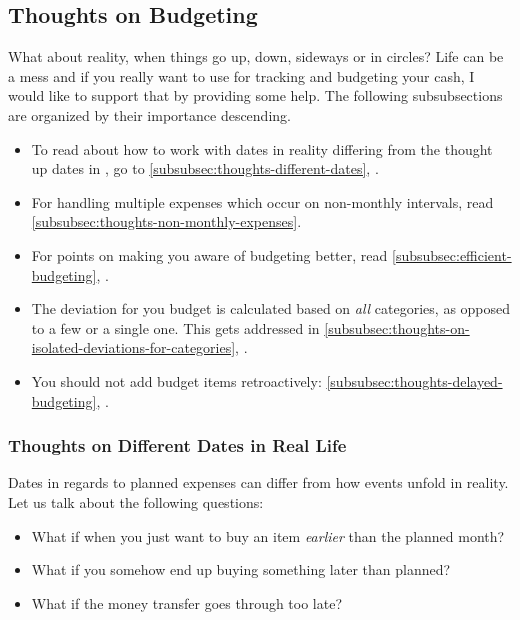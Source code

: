 \subsection{Thoughts on Budgeting}
\label{subsec:thoughts-on-budgeting}

What about reality, when things go up, down, sideways or in circles?
Life can be a mess and if you really want to use \tfn for tracking and budgeting your cash, I would like to support that by providing some help.
The following subsubsections are organized by their importance descending.
\begin{itemize}
	\item To read about how to work with dates in reality differing from the thought up dates in \tfn, go to \autoref{subsubsec:thoughts-different-dates}, .
	\item For handling multiple expenses which occur on non-monthly intervals, read \autoref{subsubsec:thoughts-non-monthly-expenses}.
	\item For points on making you aware of budgeting better, read \autoref{subsubsec:efficient-budgeting}, .
	\item The deviation for you budget is calculated based on \emph{all} categories, as opposed to a few or a single one.
	This gets addressed in \autoref{subsubsec:thoughts-on-isolated-deviations-for-categories}, .
	\item You should not add budget items retroactively: 	\autoref{subsubsec:thoughts-delayed-budgeting}, .
\end{itemize}

\subsubsection{Thoughts on Different Dates in Real Life}
\label{subsubsec:thoughts-different-dates}

Dates in regards to planned expenses can differ from how events unfold in reality.
Let us talk about the following questions:
\begin{itemize}
	\item What if when you just want to buy an item \emph{earlier} than the planned month?
	\item What if you somehow end up buying something later than planned?
	\item What if the money transfer goes through too late?
\end{itemize}

